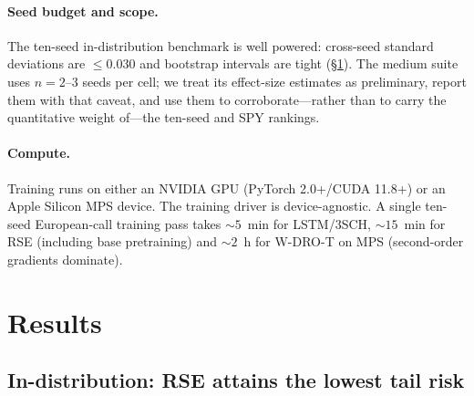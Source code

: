 \documentclass[10pt,letterpaper]{article}
\begin{document}
\paragraph{Seed budget and scope.}
The ten-seed in-distribution benchmark is well powered: cross-seed
standard deviations are $\le 0.030$ and bootstrap intervals are
tight (\S\ref{sec:results}). The medium suite uses $n=2$--$3$ seeds
per cell; we treat its effect-size estimates as preliminary, report
them with that caveat, and use them to corroborate---rather than to
carry the quantitative weight of---the ten-seed and SPY rankings.

\paragraph{Compute.}
Training runs on either an NVIDIA GPU (PyTorch 2.0+/CUDA 11.8+) or
an Apple Silicon MPS device. The training driver is device-agnostic.
A single ten-seed European-call training pass takes $\sim\!5$~min
for LSTM/3SCH, $\sim\!15$~min for RSE (including base pretraining)
and $\sim\!2$~h for W-DRO-T on MPS (second-order gradients
dominate).

\section{Results}\label{sec:results}

\subsection{In-distribution: RSE attains the lowest tail risk}
\end{document}
